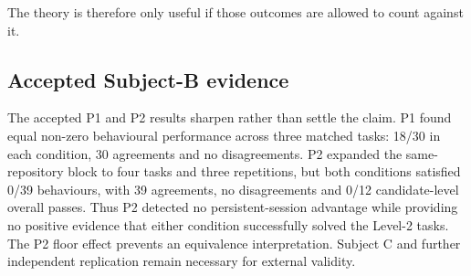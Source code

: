 The theory is therefore only useful if those outcomes are allowed to count against it.

\subsection{Accepted Subject-B evidence}

The accepted P1 and P2 results sharpen rather than settle the claim. P1 found equal non-zero behavioural performance across three matched tasks: 18/30 in each condition, 30 agreements and no disagreements. P2 expanded the same-repository block to four tasks and three repetitions, but both conditions satisfied 0/39 behaviours, with 39 agreements, no disagreements and 0/12 candidate-level overall passes. Thus P2 detected no persistent-session advantage while providing no positive evidence that either condition successfully solved the Level-2 tasks. The P2 floor effect prevents an equivalence interpretation. Subject C and further independent replication remain necessary for external validity.
